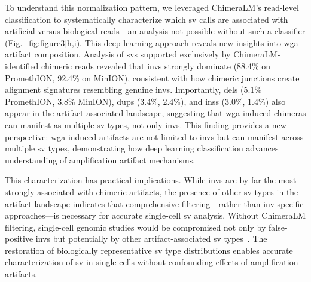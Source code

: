 \documentclass[pdflatex,sn-nature,lineno]{sn-jnl}%
\theoremstyle{thmstyleone}%
\theoremstyle{thmstyletwo}%
\theoremstyle{thmstylethree}%
\begin{document}
To understand this normalization pattern, we leveraged ChimeraLM's read-level classification to systematically characterize which \gls{sv} calls are associated with artificial versus biological reads—an analysis not possible without such a classifier (Fig.~\ref{fig:figure3}h,i).
This deep learning approach reveals new insights into \gls{wga} artifact composition.
Analysis of \glspl{sv} supported exclusively by ChimeraLM-identified chimeric reads revealed that \glspl{inv} strongly dominate (88.4\% on PromethION, 92.4\% on MinION), consistent with how chimeric junctions create alignment signatures resembling genuine \glspl{inv}.
Importantly, \glspl{del} (5.1\% PromethION, 3.8\% MinION), \glspl{dup} (3.4\%, 2.4\%), and \glspl{ins} (3.0\%, 1.4\%) also appear in the artifact-associated landscape, suggesting that \gls{wga}-induced chimeras can manifest as multiple \gls{sv} types, not only \glspl{inv}.
This finding provides a new perspective: \gls{wga}-induced artifacts are not limited to \glspl{inv} but can manifest across multiple \gls{sv} types, demonstrating how deep learning classification advances understanding of amplification artifact mechanisms.

This characterization has practical implications.
While \glspl{inv} are by far the most strongly associated with chimeric artifacts, the presence of other \gls{sv} types in the artifact landscape indicates that comprehensive filtering—rather than \gls{inv}-specific approaches—is necessary for accurate single-cell \gls{sv} analysis.
Without ChimeraLM filtering, single-cell genomic studies would be compromised not only by false-positive \glspl{inv} but potentially by other artifact-associated \gls{sv} types~\cite{kosugi2019comprehensive, mahmoud2019structural}. 
The restoration of biologically representative \gls{sv} type distributions enables accurate characterization of \gls{sv} in single cells without confounding effects of amplification artifacts.
\end{document}
